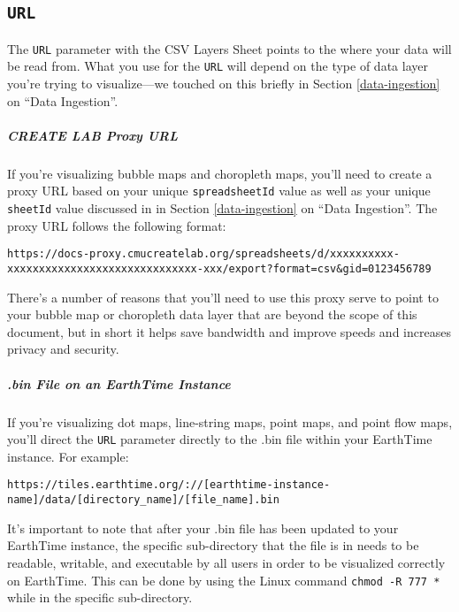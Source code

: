 \documentclass[
]{book}
\begin{document}
\hypertarget{url}{%
\subsection*{\texorpdfstring{\texttt{URL}}{URL}}\label{url}}


The \texttt{URL} parameter with the CSV Layers Sheet points to the where your data will be read from. What you use for the \texttt{URL} will depend on the type of data layer you're trying to visualize---we touched on this briefly in Section \ref{data-ingestion} on ``Data Ingestion''.

\hypertarget{create-lab-proxy-url}{%
\subparagraph*{CREATE LAB Proxy URL}\label{create-lab-proxy-url}}

If you're visualizing bubble maps and choropleth maps, you'll need to create a proxy URL based on your unique \texttt{spreadsheetId} value as well as your unique \texttt{sheetId} value discussed in in Section \ref{data-ingestion} on ``Data Ingestion''. The proxy URL follows the following format:

\texttt{https://docs-proxy.cmucreatelab.org/spreadsheets/d/xxxxxxxxxx-xxxxxxxxxxxxxxxxxxxxxxxxxxxxxx-xxx/export?format=csv\&gid=0123456789}

There's a number of reasons that you'll need to use this proxy serve to point to your bubble map or choropleth data layer that are beyond the scope of this document, but in short it helps save bandwidth and improve speeds and increases privacy and security.

\hypertarget{bin-file-on-an-earthtime-instance}{%
\subparagraph*{.bin File on an EarthTime Instance}\label{bin-file-on-an-earthtime-instance}}

If you're visualizing dot maps, line-string maps, point maps, and point flow maps, you'll direct the \texttt{URL} parameter directly to the .bin file within your EarthTime instance. For example:

\texttt{https://tiles.earthtime.org/://{[}earthtime-instance-name{]}/data/{[}directory\_name{]}/{[}file\_name{]}.bin}

It's important to note that after your .bin file has been updated to your EarthTime instance, the specific sub-directory that the file is in needs to be readable, writable, and executable by all users in order to be visualized correctly on EarthTime. This can be done by using the Linux command \texttt{chmod\ -R\ 777\ *} while in the specific sub-directory.
\end{document}
